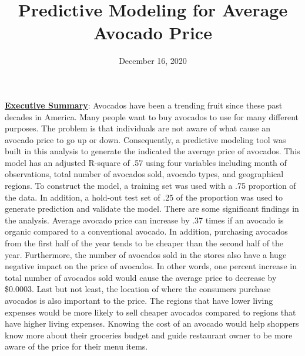 \documentclass[11pt]{article}\usepackage[]{graphicx}\usepackage[]{color}
\title{Predictive Modeling for Average Avocado Price\vspace{-5ex}}
\date{December 16, 2020\vspace{-5ex}}
\begin{document}
 
\maketitle
\hfill \break
















\noindent\textbf{\underline{Executive Summary}}: Avocados have been a trending fruit since these past decades in America. Many people want to buy avocados to use for many different purposes. The problem is that individuals are not aware of what cause an avocado price to go up or down. Consequently, a predictive modeling tool was built in this analysis to generate the indicated the average price of avocados. This model has an adjusted R-square of .57 using four variables including month of observations, total number of avocados sold, avocado types, and geographical regions. To construct the model, a training set was used with a .75 proportion of the data. In addition, a hold-out test set of .25 of the proportion was used to generate prediction and validate the model. There are some significant findings in the analysis. Average avocado price can increase by .37 times if an avocado is organic compared to a conventional avocado. In addition, purchasing avocados from the first half of the year tends to be cheaper than the second half of the year. Furthermore, the number of avocados sold in the stores also have a huge negative impact on the price of avocados. In other words, one percent increase in total number of avocados sold would cause the average price to decrease by \$0.0003. Last but not least, the location of where the consumers purchase avocados is also important to the price. The regions that have lower living expenses would be more likely to sell cheaper avocados compared to regions that have higher living expenses. Knowing the cost of an avocado would help shoppers know more about their groceries budget and guide restaurant owner to be more aware of the price for their menu items.            
\hfill \break
\end{document}
